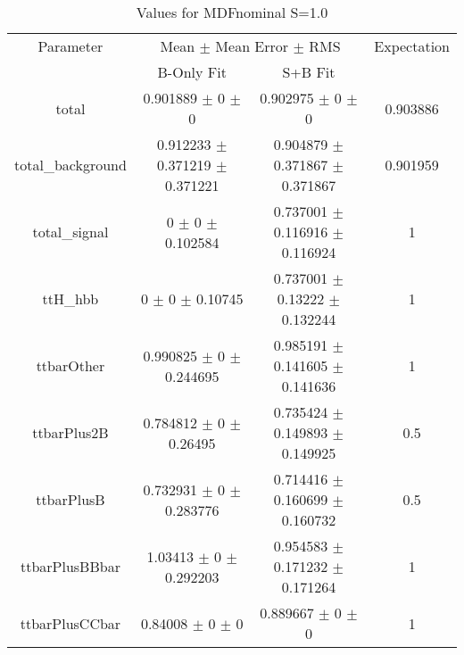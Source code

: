 \begin{table}
\centering
\caption{Values for MDFnominal S=1.0}
\begin{tabular}{cccc}
\toprule
Parameter & \multicolumn{2}{c}{Mean $\pm$ Mean Error $\pm$ RMS} & Expectation\\
 & B-Only Fit & S+B Fit & \\
\midrule
total & \num{0.901889} $\pm$ \num{0} $\pm$ \num{0} & \num{0.902975} $\pm$ \num{0} $\pm$ \num{0} & \num{0.903886}\\
total\_background & \num{0.912233} $\pm$ \num{0.371219} $\pm$ \num{0.371221} & \num{0.904879} $\pm$ \num{0.371867} $\pm$ \num{0.371867} & \num{0.901959}\\
total\_signal & \num{0} $\pm$ \num{0} $\pm$ \num{0.102584} & \num{0.737001} $\pm$ \num{0.116916} $\pm$ \num{0.116924} & \num{1}\\
ttH\_hbb & \num{0} $\pm$ \num{0} $\pm$ \num{0.10745} & \num{0.737001} $\pm$ \num{0.13222} $\pm$ \num{0.132244} & \num{1}\\
ttbarOther & \num{0.990825} $\pm$ \num{0} $\pm$ \num{0.244695} & \num{0.985191} $\pm$ \num{0.141605} $\pm$ \num{0.141636} & \num{1}\\
ttbarPlus2B & \num{0.784812} $\pm$ \num{0} $\pm$ \num{0.26495} & \num{0.735424} $\pm$ \num{0.149893} $\pm$ \num{0.149925} & \num{0.5}\\
ttbarPlusB & \num{0.732931} $\pm$ \num{0} $\pm$ \num{0.283776} & \num{0.714416} $\pm$ \num{0.160699} $\pm$ \num{0.160732} & \num{0.5}\\
ttbarPlusBBbar & \num{1.03413} $\pm$ \num{0} $\pm$ \num{0.292203} & \num{0.954583} $\pm$ \num{0.171232} $\pm$ \num{0.171264} & \num{1}\\
ttbarPlusCCbar & \num{0.84008} $\pm$ \num{0} $\pm$ \num{0} & \num{0.889667} $\pm$ \num{0} $\pm$ \num{0} & \num{1}\\
\bottomrule
\end{tabular}
\end{table}